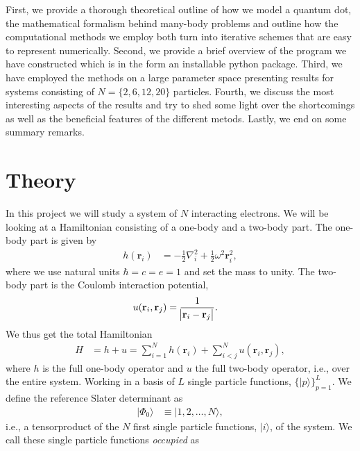 \documentclass[
    a4paper, aps, twocolumn, floatfix, superscriptaddress,
    nofootinbib]{revtex4-1}
\newcommand{\vf}{\mathbf}
\newcommand{\1}{\mathds{1}}
\newcommand{\half}{\frac{1}{2}}
\newcommand{\ket}[1]{\rvert #1\rangle}
\begin{document}
    First, we provide a thorough theoretical outline of how we model a quantum
    dot, the mathematical formalism behind many-body problems and outline how
    the computational methods we employ both turn into iterative schemes that
    are easy to represent numerically. Second, we provide a brief overview of
    the program we have constructed which is in the form an installable python
    package.  Third, we have employed the methods on a large parameter space
    presenting results for systems consisting of $N= \{2, 6, 12, 20\}$
    particles. Fourth, we discuss the most interesting aspects of the results
    and try to shed some light over the shortcomings as well as the beneficial
    features of the different metods. Lastly, we end on some summary remarks.

\section{Theory}
    In this project we will study a system of $N$ interacting electrons. We will
    be looking at a Hamiltonian consisting of a one-body and a two-body part.
    The one-body part is given by
    \begin{align}
        h(\vf{r}_i)
        &= -\half\nabla_i^2 + \half\omega^2 \vf{r}_i^2,
        \label{eq:one_body_hamiltonian}
    \end{align}
    where we use natural units $\hbar = c = e = 1$ and set the mass to unity.
    The two-body part is the Coulomb interaction potential,
    \begin{align}
        u(\vf{r}_i, \vf{r}_j)
        &= \frac{1}{\abs{\vf{r}_i - \vf{r}_j}}.
        \label{eq:two_body_operator}
    \end{align}
    We thus get the total Hamiltonian
    \begin{align}
        H &= h + u
        =
        \sum_{i = 1}^N h(\vf{r}_i) + \sum_{i < j}^N u(\vf{r}_i, \vf{r}_j),
    \end{align}
    where $h$ is the full one-body operator and $u$ the full two-body
    operator, i.e., over the entire system.  Working in a basis of $L$ single
    particle functions, $\{\ket{p}\}_{p = 1}^L$. We define the reference Slater
    determinant as
    \begin{align}
        \ket{\Phi_0} &\equiv \ket{1, 2, \dots, N},
    \end{align}
    i.e., a tensorproduct of the $N$ first single particle functions, $\ket{i}$,
    of the system. We call these single particle functions \emph{occupied} as
\end{document}
